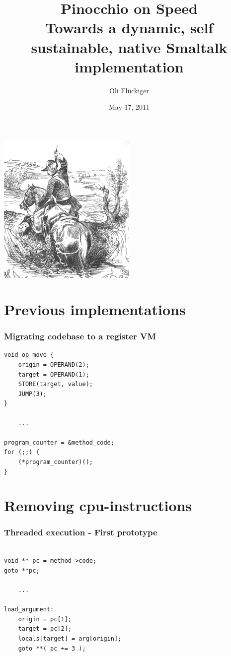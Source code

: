 \documentclass{beamer}
\title[Pinocchio on Speed]{Pinocchio on Speed \\ Towards a dynamic, self sustainable, native Smaltalk implementation}
\author{Oli Flückiger}
\institute{scg.unibe.ch}
\date{May 17, 2011}
\begin{document}
\begin{frame}
\titlepage
\end{frame}

\begin{frame}
\begin{center}\includegraphics[width=0.5\textwidth]{muenchhausen.png}\end{center}
\end{frame}

\section{Previous implementations}

\lstset{language=C}

\begin{frame}[fragile]
    \frametitle{Migrating codebase to a register VM}
    \begin{lstlisting}
void op_move {
    origin = OPERAND(2);
    target = OPERAND(1);
    STORE(target, value);
    JUMP(3);
}

    ...

program_counter = &method_code;
for (;;) {
    (*program_counter)();
}
    \end{lstlisting}
\end{frame}

\section{Removing cpu-instructions}

\begin{frame}[fragile]
    \frametitle{Threaded execution - First prototype}
    \begin{lstlisting}

void ** pc = method->code;
goto **pc;
            
    ...

load_argument:
    origin = pc[1];
    target = pc[2];
    locals[target] = arg[origin];
    goto **( pc += 3 );

    \end{lstlisting}
\end{frame}
\end{document}
